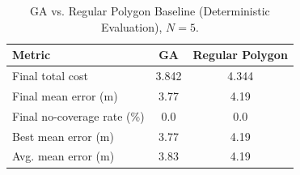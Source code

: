 \begin{table}[t]
\centering
\caption{GA vs. Regular Polygon Baseline (Deterministic Evaluation), $N=5$.}
\label{tab:ga_vs_polygon_n5}
\begin{tabular}{lcc}
\hline
Metric & GA & Regular Polygon \\
\hline
Final total cost & 3.842 & 4.344 \\
Final mean error (m) & 3.77 & 4.19 \\
Final no-coverage rate (\%) & 0.0 & 0.0 \\
Best mean error (m) & 3.77 & 4.19 \\
Avg. mean error (m) & 3.83 & 4.19 \\
\hline
\end{tabular}
\end{table}